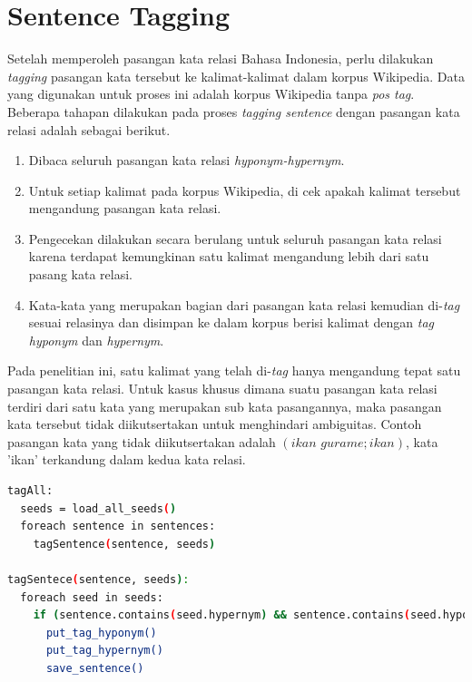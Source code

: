 \section{Sentence Tagging}
Setelah memperoleh pasangan kata relasi Bahasa Indonesia, perlu dilakukan \textit{tagging} pasangan kata tersebut ke kalimat-kalimat dalam korpus Wikipedia. Data yang digunakan untuk proses ini adalah korpus Wikipedia tanpa \textit{pos tag}. Beberapa tahapan dilakukan pada proses \textit{tagging sentence} dengan pasangan kata relasi adalah sebagai berikut.
\begin{enumerate}
  \item Dibaca seluruh pasangan kata relasi \textit{hyponym-hypernym}.
  \item Untuk setiap kalimat pada korpus Wikipedia, di cek apakah kalimat tersebut mengandung pasangan kata relasi.
  \item Pengecekan dilakukan secara berulang untuk seluruh pasangan kata relasi karena terdapat kemungkinan satu kalimat mengandung lebih dari satu pasang kata relasi.
  \item Kata-kata yang merupakan bagian dari pasangan kata relasi kemudian di-\textit{tag} sesuai relasinya dan disimpan ke dalam korpus berisi kalimat dengan \textit{tag} \textit{hyponym} dan \textit{hypernym}.
\end{enumerate}
Pada penelitian ini, satu kalimat yang telah di-\textit{tag} hanya mengandung tepat satu pasangan kata relasi. Untuk kasus khusus dimana suatu pasangan kata relasi terdiri dari satu kata yang merupakan sub kata pasangannya, maka pasangan kata tersebut tidak diikutsertakan untuk menghindari ambiguitas. Contoh pasangan kata yang tidak diikutsertakan adalah $(ikan\,\,gurame;ikan)$, kata 'ikan' terkandung dalam kedua kata relasi.
\begin{lstlisting}[language=bash]
tagAll:
  seeds = load_all_seeds()
  foreach sentence in sentences:
    tagSentence(sentence, seeds)

tagSentece(sentence, seeds):
  foreach seed in seeds:
    if (sentence.contains(seed.hypernym) && sentence.contains(seed.hyponym)):
      put_tag_hyponym()
      put_tag_hypernym()
      save_sentence()
\end{lstlisting}

